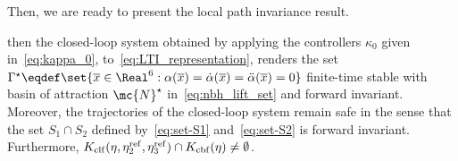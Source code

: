 {Then, we are ready to present the local path invariance result.
% 
  \begin{lemma}
  \label{lemma:invariance}
  {\akh then
  the closed-loop system obtained by applying the controllers $\kappa_0$ given in~\eqref{eq:kappa_0}, to~\eqref{eq:LTI_representation}, renders the set
  $
  \Gamma^\star \eqdef \set{\agx\in\Real^6 : \alpha(\agx) = \dot\alpha (\agx)= \ddot\alpha(\agx) = 0}
  $
  finite-time stable with basin of attraction $\mc{N}^{\star}$  in~\eqref{eq:nbh_lift_set} and forward invariant. Moreover, the trajectories of the closed-loop system remain safe in the sense that the set $S_1 \cap S_2$ defined by~\eqref{eq:set-S1} and~\eqref{eq:set-S2} is forward invariant. Furthermore,  
 $K_{\mathrm{clf}}{(\eta, {\eta}^{\mathrm{ref}}_{2}, {\eta}^{\mathrm{ref}}_{3})} \cap K_{\mathrm{cbf}}{(\eta)} \neq \emptyset$.} 
  \end{lemma}
}
